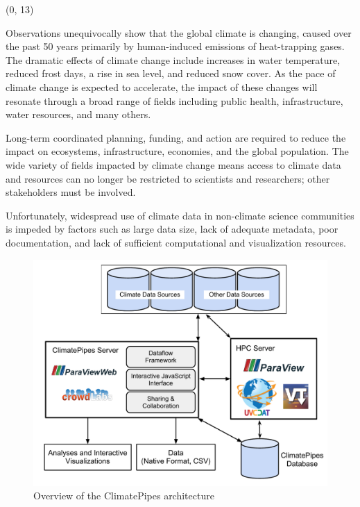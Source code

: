 \documentclass[a0,landscape]{a0poster}
\newcommand{\dospace}{\vspace*{0.9cm}}
\newenvironment{pcol}[1]{
  \begin{minipage}[t]{#1}
}{
  \end{minipage}
}
\begin{document}
\dospace


\begin{textblock}{35}(0, 13)
\begin{pcol}{\threecolwidth}


\large

Observations unequivocally show that the global climate is changing, caused over the past 50 years primarily by human-induced emissions of heat-trapping gases. The dramatic
effects of climate change include increases in water temperature, reduced frost days, a rise in sea level, and reduced snow cover. As the pace of climate change is expected to
accelerate, the impact of these changes will resonate through a broad range of fields including public health, infrastructure, water resources, and many others.

Long-term coordinated planning, funding, and action are required to reduce the impact on ecosystems, infrastructure, economies, and the global population. The wide variety of
fields impacted by climate change means access to climate data and resources can no longer be restricted to scientists and researchers; other stakeholders must be involved.

Unfortunately, widespread use of climate data in non-climate science communities is impeded by factors such as large data size, lack of adequate metadata, poor documentation,
and lack of sufficient computational and visualization resources.
\vspace{1cm}
\large
\begin{figure}[overview]
\includegraphics[height=0.6\hsize]{images/Overview}
\caption{Overview of the ClimatePipes architecture}
\end{figure}


\end{pcol}
\end{textblock}
\end{document}
